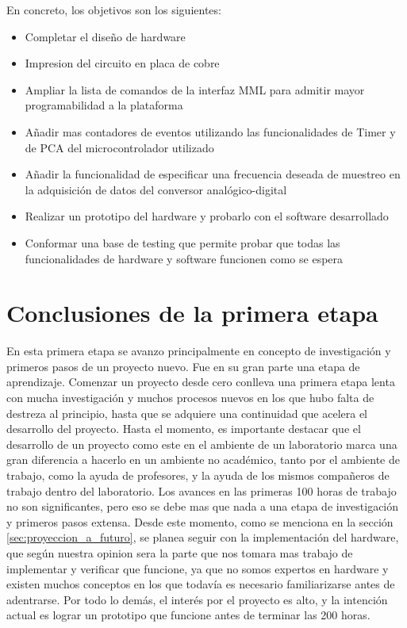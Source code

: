 \documentclass{article}
\theoremstyle{definition}
\theoremstyle{remark}
\begin{document}
En concreto, los objetivos son los siguientes:
\begin{itemize}
	\item Completar el diseño de hardware
	\item Impresion del circuito en placa de cobre
	\item Ampliar la lista de comandos de la interfaz MML para admitir mayor programabilidad a la plataforma
	\item Añadir mas contadores de eventos utilizando las funcionalidades de Timer y de PCA del microcontrolador utilizado
	\item Añadir la funcionalidad de especificar una frecuencia deseada de muestreo en la adquisición de datos del conversor analógico-digital
	\item Realizar un prototipo del hardware y probarlo con el software desarrollado
	\item Conformar una base de testing que permite probar que todas las funcionalidades de hardware y software funcionen como se espera
\end{itemize}



\section{Conclusiones de la primera etapa} %
\label{sec:conslusiones_de_la_primera_etapa}

En esta primera etapa se avanzo principalmente en concepto de investigación y primeros pasos de un proyecto nuevo. Fue en su gran parte una etapa de aprendizaje. Comenzar un proyecto desde cero conlleva una primera etapa lenta con mucha investigación y muchos procesos nuevos en los que hubo falta de destreza al principio, hasta que se adquiere una continuidad que acelera el desarrollo del proyecto. Hasta el momento, es importante destacar que el desarrollo de un proyecto como este en el ambiente de un laboratorio marca una gran diferencia a hacerlo en un ambiente no académico, tanto por el ambiente de trabajo, como la ayuda de profesores, y la ayuda de los mismos compañeros de trabajo dentro del laboratorio. Los avances en las primeras 100 horas de trabajo no son significantes, pero eso se debe mas que nada a una etapa de investigación y primeros pasos extensa. Desde este momento, como se menciona en la sección \ref{sec:proyeccion_a_futuro}, se planea seguir con la implementación del hardware, que según nuestra opinion sera la parte que nos tomara mas trabajo de implementar y verificar que funcione, ya que no somos expertos en hardware y existen muchos conceptos en los que todavía es necesario familiarizarse antes de adentrarse. Por todo lo demás, el interés por el proyecto es alto, y la intención actual es lograr un prototipo que funcione antes de terminar las 200 horas.
\end{document}
